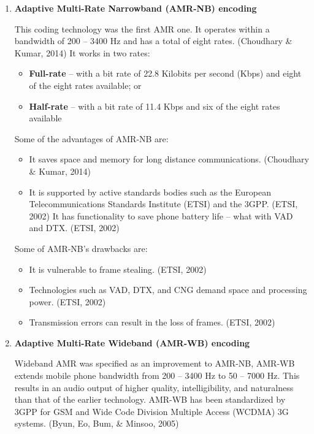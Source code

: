 \documentclass[12pt,svgnames,smaller]{article} %
\begin{document}
	\begin{enumerate}
		\item \textbf{ Adaptive Multi-Rate Narrowband (AMR-NB) encoding}
		
		This coding technology was the first AMR one. It operates within a bandwidth of 200 – 3400 Hz and has a total of eight rates. (Choudhary \& Kumar, 2014) It works in two rates:
		
		\begin{itemize}
			\item \textbf{Full-rate} – with a bit rate of 22.8 Kilobits per second (Kbps) and eight of the eight rates available; or
			\item  \textbf{Half-rate} – with a bit rate of 11.4 Kbps and six of the eight rates available
		\end{itemize}
		
		Some of the advantages of AMR-NB are:
		
		\begin{itemize}
			\item It saves space and memory for long distance communications. (Choudhary \& Kumar, 2014)
			\item It is supported by active standards bodies such as the European Telecommunications Standards Institute (ETSI) and the 3GPP. (ETSI, 2002) It has functionality to save phone battery life – what with VAD and DTX. (ETSI, 2002)
		\end{itemize}
		
		Some of AMR-NB’s drawbacks are:
		
		\begin{itemize}
			\item It is vulnerable to frame stealing. (ETSI, 2002)
			\item Technologies such as VAD, DTX, and CNG demand space and processing power. (ETSI, 2002)
			\item Transmission errors can result in the loss of frames. (ETSI, 2002) 
		\end{itemize}
		
		
		\item \textbf{ Adaptive Multi-Rate Wideband (AMR-WB) encoding}
		
		Wideband AMR was specified as an improvement to AMR-NB, AMR-WB extends mobile phone bandwidth from 200 – 3400 Hz to 50 – 7000 Hz. This results in an audio output of higher quality, intelligibility, and naturalness than that of the earlier technology. AMR-WB has been standardized by 3GPP for GSM and Wide Code Division Multiple Access (WCDMA) 3G systems. (Byun, Eo, Bum, \& Minsoo, 2005)
		

\end{enumerate}
\end{document}
